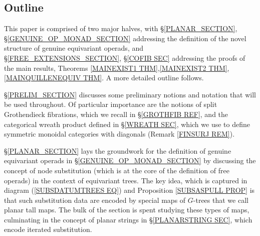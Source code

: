 \documentclass[a4paper,10pt]{article}%
\begin{document}





\subsection{Outline}

This paper is comprised of two major halves, 
with 
\S \ref{PLANAR_SECTION},
\S \ref{GENUINE_OP_MONAD_SECTION}
addressing the definition of the novel structure of
genuine equivariant operads,
and 
\S \ref{FREE_EXTENSIONS_SECTION},
\S \ref{COFIB SEC}
addressing the proofs of the main results,
Theorems \ref{MAINEXIST1 THM},\ref{MAINEXIST2 THM},\ref{MAINQUILLENEQUIV THM}.
A more detailed outline follows.

\S \ref{PRELIM_SECTION}
discusses some preliminary notions and notation that will be used throughout.
Of particular importance are the notions of 
split Grothendieck fibrations,
which we recall in \S \ref{GROTHFIB REF},
and the categorical wreath product defined in 
\S \ref{WREATH SEC}, which we use to define
symmetric monoidal categories with diagonals
(Remark \ref{FINSURJ REM}).

\S \ref{PLANAR_SECTION} lays the groundwork for the definition of genuine equivariant operads in 
\S \ref{GENUINE_OP_MONAD_SECTION} by discussing the concept of node substitution (which is at the core of the definition of free operads)
in the context of equivariant trees. The key idea, which is captured in diagram
(\ref{SUBSDATUMTREES EQ}) and Proposition \ref{SUBSASPULL PROP}
is that such substitution data are encoded by special maps of $G$-trees that we call planar tall maps. The bulk of the section is spent studying these types of maps, culminating in the concept of planar strings in \S \ref{PLANARSTRING SEC}, which encode iterated substitution.
\end{document}
